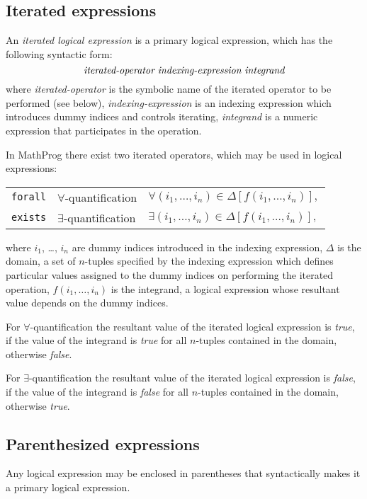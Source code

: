 \documentclass[11pt]{report}
\begin{document}
\subsection{Iterated expressions}

An {\it iterated logical expression} is a primary logical expression,
which has the following syntactic form:
$$\mbox{{\it iterated-operator} {\it indexing-expression}
{\it integrand}}$$
where {\it iterated-operator} is the symbolic name of the iterated
operator to be performed (see below), {\it indexing-expression} is an
indexing expression which introduces dummy indices and controls
iterating, {\it integrand} is a numeric expression that participates in
the operation.

In MathProg there exist two iterated operators, which may be used in
logical expressions:

{\def\arraystretch{1.4}
\noindent\hfil
\begin{tabular}{@{}lll@{}}
{\tt forall}&$\forall$-quantification&$\displaystyle
\forall(i_1,\dots,i_n)\in\Delta[f(i_1,\dots,i_n)],$\\
{\tt exists}&$\exists$-quantification&$\displaystyle
\exists(i_1,\dots,i_n)\in\Delta[f(i_1,\dots,i_n)],$\\
\end{tabular}
}

\noindent where $i_1$, \dots, $i_n$ are dummy indices introduced in
the indexing expression, $\Delta$ is the domain, a set of $n$-tuples
specified by the indexing expression which defines particular values
assigned to the dummy indices on performing the iterated operation,
$f(i_1,\dots,i_n)$ is the integrand, a logical expression whose
resultant value depends on the dummy indices.

For $\forall$-quantification the resultant value of the iterated
logical expression is {\it true}, if the value of the integrand is
{\it true} for all $n$-tuples contained in the domain, otherwise
{\it false}.

For $\exists$-quantification the resultant value of the iterated
logical expression is {\it false}, if the value of the integrand is
{\it false} for all $n$-tuples contained in the domain, otherwise
{\it true}.

\subsection{Parenthesized expressions}

Any logical expression may be enclosed in parentheses that
syntactically makes it a primary logical expression.
\end{document}
